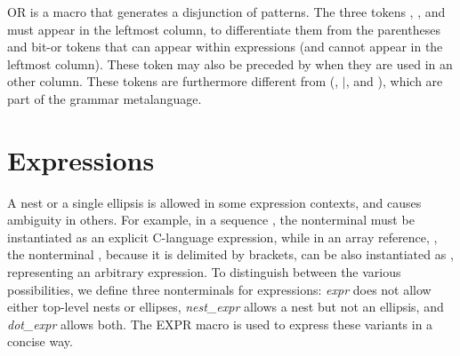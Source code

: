 \begin{grammar}


\end{grammar}

\noindent
OR is a macro that generates a disjunction of patterns.  The three
tokens \T{(}, \T{\ttmid}, and \T{)} must appear in the leftmost
column, to differentiate them from the parentheses and bit-or tokens
that can appear within expressions (and cannot appear in the leftmost
column). These token may also be preceded by \texttt{\bs}
when they are used in an other column.  These tokens are furthermore
different from (, \(\mid\), and ), which are part of the grammar
metalanguage.

\section{Expressions}

A nest or a single ellipsis is allowed in some expression contexts, and
causes ambiguity in others.  For example, in a sequence , the nonterminal  must be instantiated as an
explicit C-language expression, while in an array reference,
, the
nonterminal , because it is delimited by brackets, can
be also instantiated as \mtt{\ldots}, representing an arbitrary expression.  To
distinguish between the various possibilities, we define three nonterminals
for expressions: {\em expr} does not allow either top-level nests or
ellipses, {\em nest\_expr} allows a nest but not an ellipsis, and {\em
dot\_expr} allows both.  The EXPR macro is used to express these variants
in a concise way.

